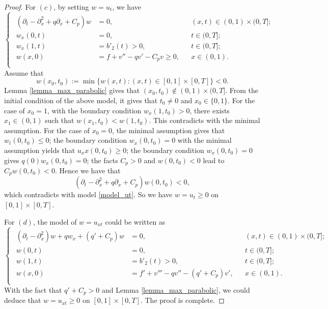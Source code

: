 \documentclass[11pt]{article}
\numberwithin{equation}{section}
\begin{document}
\begin{proof}
For $(c)$, by setting $w=u_t$, we have 
 \begin{equation}\label{model_ut}
 \begin{cases}
  \begin{aligned}
   (\partial_t-\partial_x^2+q\partial_x+C_p)w&=0, &&(x,t)\in(0,1)\times(0,T];\\
   w_x(0,t)&=0,&&t\in(0,T];\\
   w_x(1,t)&=b'_2(t)>0,&&t\in(0,T];\\
   w(x,0)&=f+v''-qv'-C_pv\ge 0,&&x\in(0,1).\\
  \end{aligned}
 \end{cases}
\end{equation}
Assume that 
$$w(x_0,t_0):=\min\{w(x,t):(x,t)\in[0,1]\times[0,T]\}<0.$$
Lemma \ref{lemma_max_parabolic} gives that $(x_0,t_0)\notin (0,1)\times(0,T]$. 
From the initial condition of the above model, it gives that $t_0\ne 0$ and $x_0\in \{0,1\}$. For the case of $x_0=1$, with the boundary condition $w_x(1,t_0)> 0$,  there exists $x_1\in (0,1)$ such that $w(x_1,t_0)< w(1,t_0)$. This contradicts with the minimal assumption. For the case of $x_0=0$, the minimal assumption gives that $w_t(0,t_0)\le 0$; the boundary condition $w_x(0,t_0)=0$ with the minimal assumption yields that $u_xx(0,t_0)\ge 0$; the boundary condition $w_x(0,t_0)=0$ gives $q(0)w_x(0,t_0)=0$; the facts $C_p>0$ and $w(0,t_0)<0$ lead to $C_pw(0,t_0)<0$. Hence we have that 
$$(\partial_t-\partial_x^2+q\partial_x+C_p)w(0,t_0)<0,$$
which contradicts with model \eqref{model_ut}. 
So we have $w=u_t\ge 0$ on $[0,1]\times[0,T]$. 


For $(d)$, the model of $w=u_{xt}$ could be written as 
\begin{equation*}
 \begin{cases}
  \begin{aligned}
   (\partial_t-\partial_x^2)w+qw_x+(q'+C_p)w&=0, &&(x,t)\in(0,1)\times(0,T];\\
   w(0,t)&=0,&&t\in(0,T];\\
   w(1,t)&=b'_2(t)>0,&&t\in(0,T];\\
   w(x,0)&=f'+v'''-qv''-(q'+C_p)v',&&x\in(0,1).\\
  \end{aligned}
 \end{cases}
\end{equation*}
With the fact that $q'+C_p>0$ and Lemma \ref{lemma_max_parabolic}, we could deduce that $w=u_{xt}\ge 0$ on $[0,1]\times[0,T]$. The proof is complete. 
\end{proof}
\end{document}
